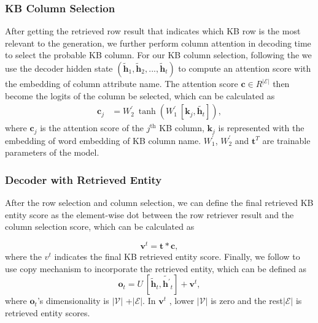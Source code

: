 \documentclass[11pt,a4paper]{article}
\begin{document}
\subsubsection{KB Column Selection}
After getting the retrieved row result that indicates which KB row is the most relevant to the generation, 
we further perform column attention in decoding time to select the probable KB column.
For our KB column selection, following the  we use the decoder hidden state $(\tilde{\mathbf{h}}_{1}, \tilde{\mathbf{h}}_2, ...,\tilde {\mathbf{h}}_t)$ to compute an attention score with the embedding of column attribute name.
The attention score  $\mathbf{c}\in R^{|\mathcal{E}|}$ then become the logits of the column be selected, which can be calculated as
\begin{align*}
\mathbf{c}_{j} & = W^{'}_{2}\  \tanh(W^{'}_{1}\ [\mathbf{k}_{j}, \tilde {\mathbf{h}_{t}}]),
\end{align*}
where $\mathbf{c}_j$ is the attention score of the $j^{\text{th}}$ KB column, $\mathbf{k}_j$ is represented with the embedding of word embedding of KB column name. $W^{'}_{1}$, $W^{'}_{2}$ and $\mathbf{t}^{T}$ are trainable parameters of the model.
 
 \subsubsection{Decoder with Retrieved Entity }
 After the row selection and column selection, 
 we can define the final retrieved KB entity score as the element-wise dot between the row retriever result and the column selection score, which can be calculated as

\begin{equation} \label{eq:retriever}
	  \mathbf{v}^{t}  = \mathbf{t} * \mathbf{c},
\end{equation}
 where the $v^{t}$  indicates the final KB retrieved entity score.
 Finally, we follow	 to use copy mechanism to incorporate the retrieved entity, which can be defined as 
 \[\mathbf{o}_t = U\ [\tilde{\mathbf{h}}_t, \tilde{\mathbf{h}^{'}}_t] + \mathbf{v}^t,\] 
 where $\mathbf{o}_t$’s dimensionality is $ |\mathcal{V}|$ +$|\mathcal{E}|$. In $\mathbf{v}^t$ , lower $ |\mathcal{V}|$ is zero and the rest$|\mathcal{E}|$ is retrieved entity scores.
\end{document}
